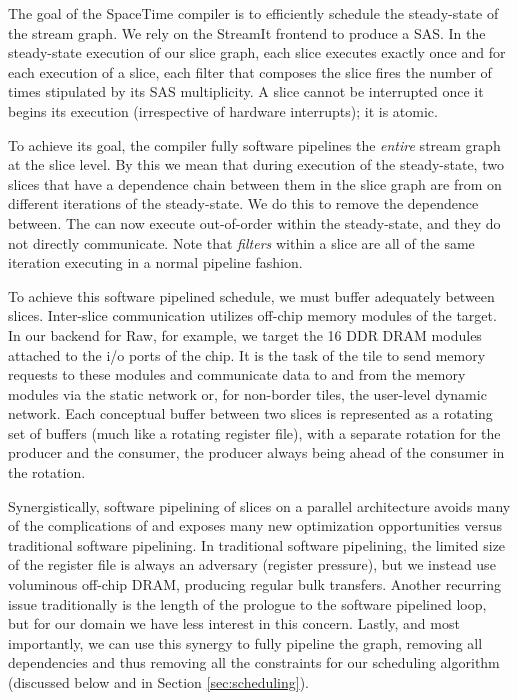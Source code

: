 The goal of the SpaceTime compiler is to efficiently schedule the
steady-state of the stream graph.  We rely on the StreamIt frontend to
produce a SAS.  In the steady-state execution of our slice graph, each
slice executes exactly once and for each execution of a slice, each
filter that composes the slice fires the number of times stipulated by
its SAS multiplicity.  A slice cannot be interrupted once it begins
its execution (irrespective of hardware interrupts); it is atomic.

To achieve its goal, the compiler fully software pipelines the {\it
entire} stream graph at the slice level. By this we mean that during
execution of the steady-state, two slices that have a dependence chain
between them in the slice graph are from on different iterations of
the steady-state.  We do this to remove the dependence between.  The
can now execute out-of-order within the steady-state, and they do not
directly communicate.  Note that {\it filters} within a slice are all of the
same iteration executing in a normal pipeline fashion.

To achieve this software pipelined schedule, we must buffer adequately
between slices.  Inter-slice communication utilizes off-chip memory
modules of the target.  In our backend for Raw, for example, we target
the 16 DDR DRAM modules attached to the i/o ports of the chip.  It is
the task of the tile to send memory requests to these modules and
communicate data to and from the memory modules via the static network
or, for non-border tiles, the user-level dynamic network.  Each
conceptual buffer between two slices is represented as a rotating set
of buffers (much like a rotating register file), with a separate
rotation for the producer and the consumer, the producer
always being ahead of the consumer in the rotation.

Synergistically, software pipelining of slices on a parallel
architecture avoids many of the complications of and exposes many new
optimization opportunities versus traditional software pipelining.  In
traditional software pipelining, the limited size of the register file
is always an adversary (register pressure), but we instead use
voluminous off-chip DRAM, producing regular bulk transfers.  Another
recurring issue traditionally is the length of the prologue to the
software pipelined loop, but for our domain we have less interest in
this concern.  Lastly, and most importantly, we can use this synergy
to fully pipeline the graph, removing all dependencies and thus
removing all the constraints for our scheduling algorithm (discussed
below and in Section \ref{sec:scheduling}).

